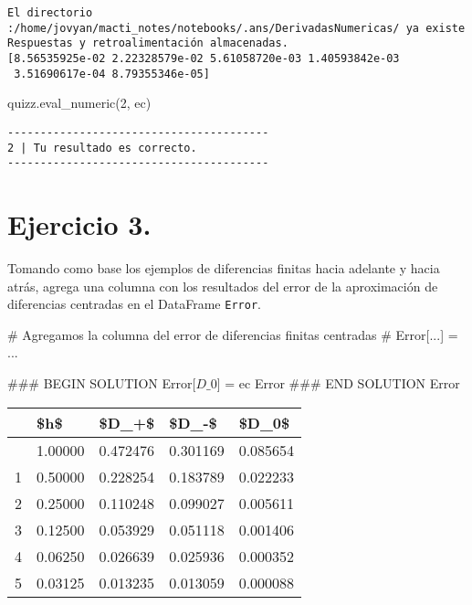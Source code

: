 \documentclass[
  letterpaper,
  DIV=11,
  numbers=noendperiod]{scrreprt}
\newenvironment{Shaded}{\begin{snugshade}}{\end{snugshade}}
\newcommand{\CommentTok}[1]{\textcolor[rgb]{0.37,0.37,0.37}{#1}}
\newcommand{\NormalTok}[1]{\textcolor[rgb]{0.00,0.23,0.31}{#1}}
\newcommand{\OperatorTok}[1]{\textcolor[rgb]{0.37,0.37,0.37}{#1}}
\newcommand{\RegionMarkerTok}[1]{\textcolor[rgb]{0.00,0.23,0.31}{#1}}
\newcommand{\StringTok}[1]{\textcolor[rgb]{0.13,0.47,0.30}{#1}}
\begin{document}
\begin{verbatim}
El directorio :/home/jovyan/macti_notes/notebooks/.ans/DerivadasNumericas/ ya existe
Respuestas y retroalimentación almacenadas.
[8.56535925e-02 2.22328579e-02 5.61058720e-03 1.40593842e-03
 3.51690617e-04 8.79355346e-05]
\end{verbatim}

\begin{Shaded}
\begin{Highlighting}[]
\NormalTok{quizz.eval\_numeric(}\StringTok{\textquotesingle{}2\textquotesingle{}}\NormalTok{, ec)}
\end{Highlighting}
\end{Shaded}

\begin{verbatim}
----------------------------------------
2 | Tu resultado es correcto.
----------------------------------------
\end{verbatim}

\section{Ejercicio 3.}\label{ejercicio-3.}

Tomando como base los ejemplos de diferencias finitas hacia adelante y
hacia atrás, agrega una columna con los resultados del error de la
aproximación de diferencias centradas en el DataFrame \texttt{Error}.

\begin{Shaded}
\begin{Highlighting}[]
\CommentTok{\# Agregamos la columna del error de diferencias finitas centradas}
\CommentTok{\# Error[\textquotesingle{}...\textquotesingle{}] = ...}

\CommentTok{\#\#\# }\RegionMarkerTok{BEGIN}\CommentTok{ SOLUTION}
\NormalTok{Error[}\StringTok{\textquotesingle{}$D\_0$\textquotesingle{}}\NormalTok{] }\OperatorTok{=}\NormalTok{ ec}
\NormalTok{Error}
\CommentTok{\#\#\# }\RegionMarkerTok{END}\CommentTok{ SOLUTION}
\NormalTok{Error}
\end{Highlighting}
\end{Shaded}

\begin{longtable}[]{@{}lllll@{}}
\toprule\noalign{}
& \$h\$ & \$D\_+\$ & \$D\_-\$ & \$D\_0\$ \\
\midrule\noalign{}
\endhead
\bottomrule\noalign{}
\endlastfoot
0 & 1.00000 & 0.472476 & 0.301169 & 0.085654 \\
1 & 0.50000 & 0.228254 & 0.183789 & 0.022233 \\
2 & 0.25000 & 0.110248 & 0.099027 & 0.005611 \\
3 & 0.12500 & 0.053929 & 0.051118 & 0.001406 \\
4 & 0.06250 & 0.026639 & 0.025936 & 0.000352 \\
5 & 0.03125 & 0.013235 & 0.013059 & 0.000088 \\
\end{longtable}
\end{document}
